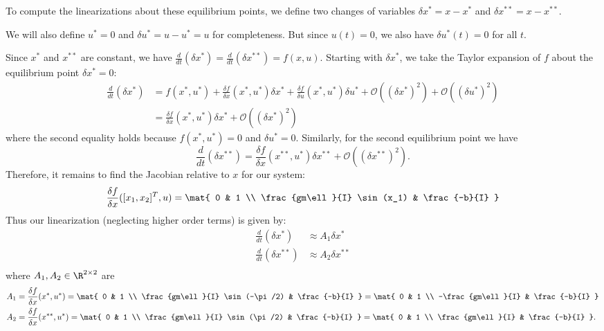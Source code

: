 \documentclass{homework}
\begin{document}
\begin{letterenum}
    To compute the linearizations about these equilibrium points, we define
    two changes of variables $\delta x^* = x - x^*$
    and $\delta x^{**} = x - x^{**}$.
    
    We will also define $u^* = 0$ and $\delta u^* = u - u^* = u$ for completeness.
    But since $u(t) = 0$, we also have $\delta u^*(t) = 0$ for all $t$.

    Since $x^*$ and $x^{**}$ are constant, we have
    $\frac{d}{dt}(\delta x^*) = \frac{d}{dt}(\delta x^{**}) = f(x, u)$. Starting
    with $\delta x^*$, we take the Taylor expansion of $f$ about the equilibrium 
    point $\delta x^* = 0$:
    \begin{align*}
        \frac{d}{dt}(\delta x^*) &= f(x^*, u^*) +
            \frac{\delta f}{\delta x}(x^*, u^*) \delta x^*
            + \frac{\delta f}{\delta u}(x^*, u^*) \delta u^*
            + \mathcal{O}((\delta x^*)^2) + \mathcal{O}((\delta u^*)^2) \\
            &= \frac{\delta f}{\delta x}(x^*, u^*) \delta x^* + \mathcal{O}((\delta x^*)^2)
    \end{align*}
    where the second equality holds because $f(x^*, u^*) = 0$ and
    $\delta u^* = 0$. Similarly, for the second equilibrium point we have
    \begin{equation*}
        \frac{d}{dt}{(\delta x^{**})} = \frac{\delta f}{\delta x} (x^{**}, u^*)\delta x^{**}
            + \mathcal{O}((\delta x^{**})^2).
    \end{equation*}
    Therefore, it remains to find the Jacobian relative to $x$ for our system:
    \begin{equation*}
        \frac{\delta f}{\delta x}([x_1, x_2]^T, u) = \mat{
            0 & 1 \\
            \frac{gm\ell}{I} \sin(x_1) & \frac{-b}{I}
        }
    \end{equation*}
    Thus our linearization (neglecting higher order terms) is given by:
    \begin{align*}
        \frac{d}{dt}(\delta x^*) &\approx A_1 \delta x^* \\
        \frac{d}{dt}(\delta x^{**}) &\approx A_2 \delta x^{**} \\
    \end{align*}
    where $A_1, A_2\in\R^{2\times 2}$ are
    \begin{align*}
        A_1 &= \frac{\delta f}{\delta x}(x^*, u^*) = \mat{
            0 & 1 \\
            \frac{gm\ell}{I} \sin(-\pi/2) & \frac{-b}{I}
        } = \mat{
            0 & 1 \\
            -\frac{gm\ell}{I} & \frac{-b}{I}
        } \\
        A_2 &= \frac{\delta f}{\delta x}(x^{**}, u^*) = \mat{
            0 & 1 \\
            \frac{gm\ell}{I} \sin(\pi/2) & \frac{-b}{I}
        } = \mat{
            0 & 1 \\
            \frac{gm\ell}{I} & \frac{-b}{I}
        }.
    \end{align*}


\end{letterenum}
\end{document}
